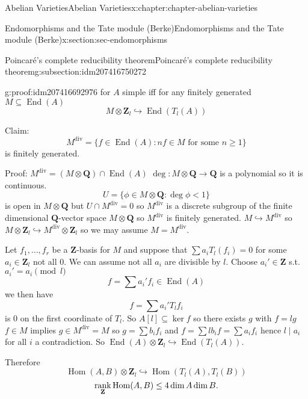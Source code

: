 \documentclass[oneside,10pt,]{book}
\newcommand{\qedhere}{\relax}
\numberwithin{equation}{section}
\newcommand{\lb}{[}
\newcommand{\rb}{]}
\newcommand{\ZZ}{\mathbf{Z}}
\newcommand{\QQ}{\mathbf{Q}}
\DeclareMathOperator{\End}{End}
\DeclareMathOperator{\Hom}{Hom}
\DeclareMathOperator{\rank}{rank}
\newcommand{\lt}{<}
\begin{document}
\begin{chapterptx}{Abelian Varieties}{}{Abelian Varieties}{}{}{x:chapter:chapter-abelian-varieties}
\begin{sectionptx}{Endomorphisms and the Tate module (Berke)}{}{Endomorphisms and the Tate module (Berke)}{}{}{x:section:sec-endomorphisms}
\begin{subsectionptx}{Poincaré's complete reducibility theorem}{}{Poincaré's complete reducibility theorem}{}{}{g:subsection:idm207416750272}
\begin{proofptx}{}{g:proof:idm207416692976}
for \(A\) simple iff for any finitely generated \(M \subseteq \End(A)\)%
\begin{equation*}
M \otimes \ZZ_l \hookrightarrow \End(T_l(A))
\end{equation*}
%
\par
Claim:%
\begin{equation*}
M^{\text{div}} = \{f\in \End(A) : nf\in M \text{ for some }n\ge 1\}
\end{equation*}
is finitely generated.%
\par
Proof: \(M^\text{div} = (M\otimes \QQ) \cap \End(A)\) \(\deg \colon M \otimes \QQ \to \QQ\) is a polynomial so it is continuous.%
\begin{equation*}
U = \{\phi\in M \otimes \QQ : \deg \phi \lt 1\}
\end{equation*}
is open in \(M \otimes \QQ\) but \(U \cap M^\text{div} = 0\) so \(M^\text{div} \) is a discrete subgroup of the finite dimensional \(\QQ\)-vector space \(M \otimes \QQ\) so \(M^\text{div}\) is finitely generated. \(M \hookrightarrow M^\text{div}\) so \(M \otimes \ZZ_l \hookrightarrow M^\text{div} \otimes \ZZ_l\) so  we may assume \(M = M^\text{div}\).%
\par
Let \(f_1,\ldots, f_r\) be a \(\ZZ\)-basis for \(M\) and suppose that \(\sum a_iT_l(f_i)=0\) for some \(a_i \in \ZZ_l\) not all 0. We can assume not all \(a_i\) are divisible by \(l\). Choose \(a_i' \in \ZZ\) s.t. \(a_i'=a_i \pmod{l}\)%
\begin{equation*}
f = \sum a_i' f_i \in \End(A)
\end{equation*}
we then have%
\begin{equation*}
f = \sum a_i' T_lf_i
\end{equation*}
is 0 on the first coordinate of \(T_l\). So \(A\lb l \rb \subseteq \ker f\) so there exists \(g\) with \(f= lg\) \(f\in M\) implies \(g\in M^\text{div} = M\) so \(g = \sum b_i f_i\) and \(f = \sum lb_i f = \sum a_i f_i\) hence \(l\mid a_i\) for all \(i\) a contradiction. So \(\End(A)\otimes \ZZ_l \hookrightarrow \End(T_l(A))\).%
\par
Therefore%
\begin{equation*}
\Hom(A,B) \otimes \ZZ_l \hookrightarrow \Hom(T_l(A), T_l(B))
\end{equation*}
%
\begin{equation*}
\rank_\ZZ \Hom(A,B) \le 4 \dim A\dim B\text{.}\qedhere
\end{equation*}
%
\end{proofptx}
\end{subsectionptx}

\end{sectionptx}
\end{chapterptx}
\end{document}
